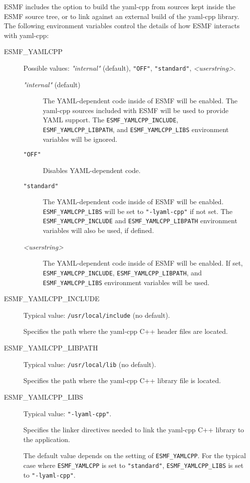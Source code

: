 ESMF includes the option to build the yaml-cpp from sources kept inside the
ESMF source tree, or to link against an external build of the yaml-cpp library.
The following environment variables control the details of how ESMF interacts
with yaml-cpp:

\begin{description}

\item[ESMF\_YAMLCPP] Possible values: {\it "internal"} (default), {\tt "OFF"},
{\tt "standard"}, {\it <userstring>}.

\begin{description}
\item[{\it "internal"} (default)] The YAML-dependent code inside of ESMF will
be enabled.
The yaml-cpp sources included with ESMF will be used to provide YAML support.
The {\tt ESMF\_YAMLCPP\_INCLUDE}, {\tt ESMF\_YAMLCPP\_LIBPATH}, and
{\tt ESMF\_YAMLCPP\_LIBS} environment variables will be ignored.

\item[{\tt "OFF"}] Disables YAML-dependent code.

\item[{\tt "standard"}] The YAML-dependent code inside of ESMF will
be enabled.
{\tt ESMF\_YAMLCPP\_LIBS} will be set to {\tt "-lyaml-cpp"} if not set.
The {\tt ESMF\_YAMLCPP\_INCLUDE} and {\tt ESMF\_YAMLCPP\_LIBPATH} environment
variables will also be used, if defined.

\item[{\it <userstring>}] The YAML-dependent code inside of ESMF will
be enabled.
If set, {\tt ESMF\_YAMLCPP\_INCLUDE}, {\tt ESMF\_YAMLCPP\_LIBPATH}, and
{\tt ESMF\_YAMLCPP\_LIBS} environment variables will be used.
\end{description}

\item[ESMF\_YAMLCPP\_INCLUDE] Typical value: {\tt /usr/local/include}
(no default).

Specifies the path where the yaml-cpp C++ header files are located.

\item[ESMF\_YAMLCPP\_LIBPATH] Typical value: {\tt /usr/local/lib} (no default).

Specifies the path where the yaml-cpp C++ library file is located.

\item[ESMF\_YAMLCPP\_LIBS] Typical value: {\tt "-lyaml-cpp"}.

Specifies the linker directives needed to link the yaml-cpp C++ library to
the application.

The default value depends on the setting of {\tt ESMF\_YAMLCPP}.  For the
typical case where {\tt ESMF\_YAMLCPP} is set to {\tt "standard"},
{\tt ESMF\_YAMLCPP\_LIBS} is set to {\tt "-lyaml-cpp"}.
\end{description}


